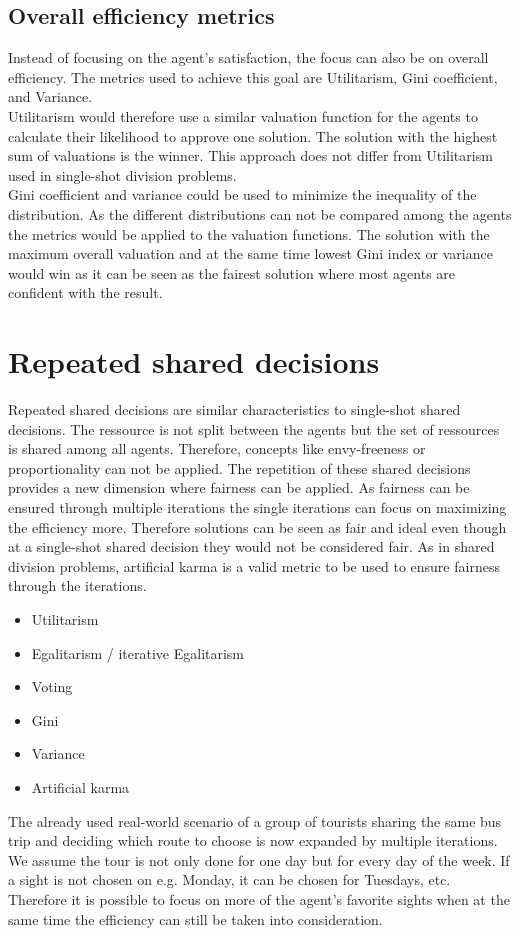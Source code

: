 \documentclass[german, a4paper, 11pt, oneside]{scrbook}
\begin{document}
\subsection{Overall efficiency metrics}
Instead of focusing on the agent's satisfaction, the focus can also be on overall efficiency. The metrics used to achieve this goal are Utilitarism, Gini coefficient, and Variance. \\Utilitarism would therefore use a similar valuation function for the agents to calculate their likelihood to approve one solution. The solution with the highest sum of valuations is the winner. This approach does not differ from Utilitarism used in single-shot division problems. 
\\Gini coefficient and variance could be used to minimize the inequality of the distribution. As the different distributions can not be compared among the agents the metrics would be applied to the valuation functions. The solution with the maximum overall valuation and at the same time lowest Gini index or variance would win as it can be seen as the fairest solution where most agents are confident with the result.
\section{Repeated shared decisions}
Repeated shared decisions are similar characteristics to single-shot shared decisions. The ressource is not split between the agents but the set of ressources is shared among all agents. Therefore, concepts like envy-freeness or proportionality can not be applied. The repetition of these shared decisions provides a new dimension where fairness can be applied. As fairness can be ensured through multiple iterations the single iterations can focus on maximizing the efficiency more. Therefore solutions can be seen as fair and ideal even though at a single-shot shared decision they would not be considered fair. As in shared division problems, artificial karma is a valid metric to be used to ensure fairness through the iterations.
\begin{itemize}
  \item Utilitarism
  \item Egalitarism / iterative Egalitarism
  \item Voting
\item Gini 
\item Variance
\item Artificial karma
\end{itemize}
The already used real-world scenario of a group of tourists sharing the same bus trip and deciding which route to choose is now expanded by multiple iterations. We assume the tour is not only done for one day but for every day of the week. If a sight is not chosen on e.g. Monday, it can be chosen for Tuesdays, etc. Therefore it is possible to focus on more of the agent's favorite sights when at the same time the efficiency can still be taken into consideration.
\end{document}
